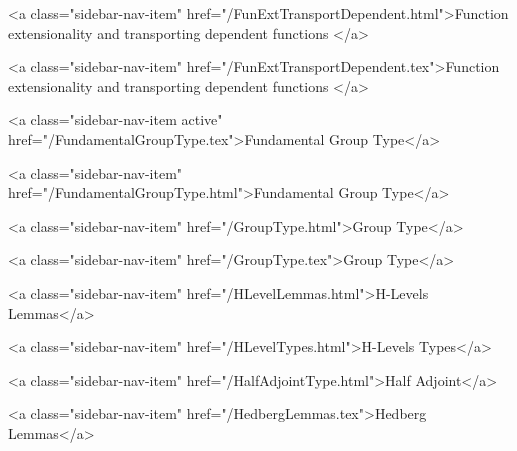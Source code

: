       
    
      
        
          <a class="sidebar-nav-item" href="/FunExtTransportDependent.html">Function extensionality and transporting dependent functions </a>
        
      
    
      
        
          <a class="sidebar-nav-item" href="/FunExtTransportDependent.tex">Function extensionality and transporting dependent functions </a>
        
      
    
      
        
          <a class="sidebar-nav-item active" href="/FundamentalGroupType.tex">Fundamental Group Type</a>
        
      
    
      
        
          <a class="sidebar-nav-item" href="/FundamentalGroupType.html">Fundamental Group Type</a>
        
      
    
      
        
          <a class="sidebar-nav-item" href="/GroupType.html">Group Type</a>
        
      
    
      
        
          <a class="sidebar-nav-item" href="/GroupType.tex">Group Type</a>
        
      
    
      
        
          <a class="sidebar-nav-item" href="/HLevelLemmas.html">H-Levels Lemmas</a>
        
      
    
      
        
          <a class="sidebar-nav-item" href="/HLevelTypes.html">H-Levels Types</a>
        
      
    
      
        
          <a class="sidebar-nav-item" href="/HalfAdjointType.html">Half Adjoint</a>
        
      
    
      
        
          <a class="sidebar-nav-item" href="/HedbergLemmas.tex">Hedberg Lemmas</a>
        
      
    
      
        
